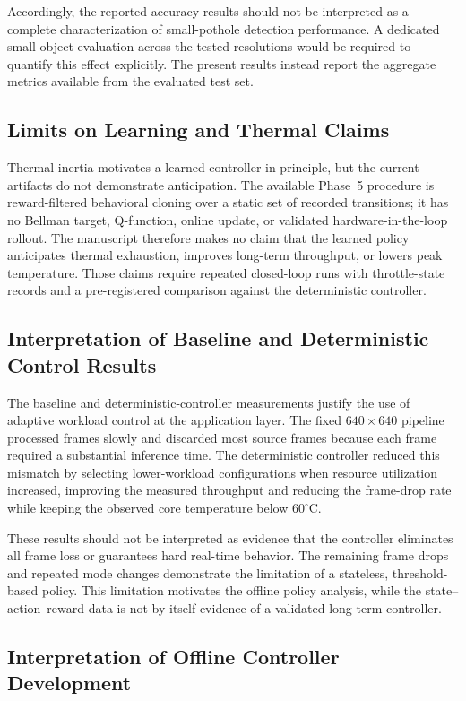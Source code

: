 \documentclass{ieeeaccess}
\begin{document}
Accordingly, the reported accuracy results should not be interpreted as a
complete characterization of small-pothole detection performance. A
dedicated small-object evaluation across the tested resolutions would be
required to quantify this effect explicitly. The present results instead
report the aggregate metrics available from the evaluated test set. 

\subsection{Limits on Learning and Thermal Claims}
Thermal inertia motivates a learned controller in principle, but the current
artifacts do not demonstrate anticipation. The available Phase~5 procedure is
reward-filtered behavioral cloning over a static set of recorded transitions;
it has no Bellman target, Q-function, online update, or validated
hardware-in-the-loop rollout. The manuscript therefore makes no claim that
the learned policy anticipates thermal exhaustion, improves long-term
throughput, or lowers peak temperature. Those claims require repeated
closed-loop runs with throttle-state records and a pre-registered comparison
against the deterministic controller.

\subsection{Interpretation of Baseline and Deterministic Control Results}

The baseline and deterministic-controller measurements justify the use of
adaptive workload control at the application layer. The fixed $640 \times 640$
pipeline processed frames slowly and discarded most source frames because each
frame required a substantial inference time. The deterministic controller
reduced this mismatch by selecting lower-workload configurations when resource
utilization increased, improving the measured throughput and reducing the
frame-drop rate while keeping the observed core temperature below $60^\circ$C.

These results should not be interpreted as evidence that the controller
eliminates all frame loss or guarantees hard real-time behavior. The remaining
frame drops and repeated mode changes demonstrate the limitation of a
stateless, threshold-based policy. This limitation motivates the offline policy analysis, while the
state--action--reward data is not by itself evidence of a validated
long-term controller.

\subsection{Interpretation of Offline Controller Development}
\end{document}
